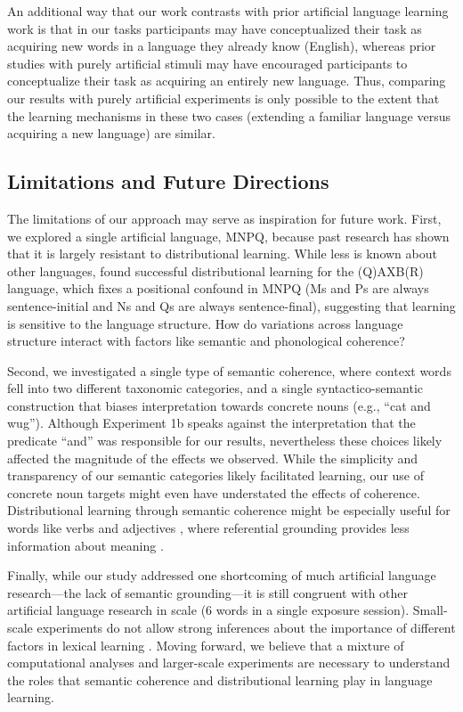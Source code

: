 \documentclass[man,longtable,floatsintext]{my-apa6}
\begin{document}
An additional way that our work contrasts with prior artificial language learning work is that in our tasks participants may have conceptualized their task as acquiring new words in a language they already know (English), whereas prior studies with purely artificial stimuli may have encouraged participants to conceptualize their task as acquiring an entirely new language. Thus, comparing our results with purely artificial experiments is only possible to the extent that the learning mechanisms in these two cases (extending a familiar language versus acquiring a new language) are similar.

\subsection{Limitations and Future Directions}

The limitations of our approach may serve as inspiration for future work. First, we explored a single artificial language, MNPQ, because past research has shown that it is largely resistant to distributional learning. While less is known about other languages, \cite{reeder2009} found successful distributional learning for the (Q)AXB(R) language, which fixes a positional confound in MNPQ (Ms and Ps are always sentence-initial and Ns and Qs are always sentence-final), suggesting that learning is sensitive to the language structure. How do variations across language structure interact with factors like semantic and phonological coherence?

Second, we investigated a single type of semantic coherence, where context words fell into two different taxonomic categories, and a single syntactico-semantic construction that biases interpretation towards concrete nouns (e.g., ``cat and wug''). Although Experiment 1b speaks against the interpretation that the predicate ``and'' was responsible for our results, nevertheless these choices likely affected the magnitude of the effects we observed. While the simplicity and transparency of our semantic categories likely facilitated learning, our use of concrete noun targets might even have understated the effects of coherence. Distributional learning through semantic coherence might be especially useful for words like verbs and adjectives \citep{redington1998}, where referential grounding provides less information about meaning \citep{gleitman1990}.

Finally, while our study addressed one shortcoming of much artificial language research---the lack of semantic grounding---it is still congruent with other artificial language research in scale (6 words in a single exposure session). Small-scale experiments do not allow strong inferences about the importance of different factors in lexical learning \citep{romberg2010, frank2013}. Moving forward, we believe that a mixture of computational analyses and larger-scale experiments are necessary to understand the roles that semantic coherence and distributional learning play in language learning.
\end{document}
